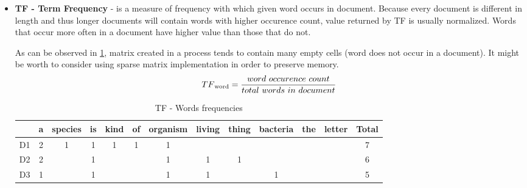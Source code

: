 \begin{itemize}
	\item \textbf{TF - Term Frequency} - is a measure of frequency with which given word occurs in document. Because every document is different in length and thus longer documents will contain words with higher occurence count, value returned by TF is usually normalized. Words that occur more often in a document have higher value than those that do not.
	
	As can be observed in \ref{tf_idf_tf_freq}, matrix created in a process tends to contain many empty cells (word does not occur in a document). It might be worth to consider using sparse matrix implementation in order to preserve memory.
	\[TF\textsubscript{word}=\frac{word\ occurence\ count}{total\ words\ in\ document}\]	
\begin{table}[ht]
	\centering
	\caption{TF - Words frequencies}
	\label{tf_idf_tf_freq}
	\begin{tabular}{@{}lccccccccccc|c|@{}}
		\toprule
		& \multicolumn{1}{l}{a} & \multicolumn{1}{l}{species} & \multicolumn{1}{l}{is} & \multicolumn{1}{l}{kind} & \multicolumn{1}{l}{of} & \multicolumn{1}{l}{organism} & \multicolumn{1}{l}{living} & \multicolumn{1}{l}{thing} & \multicolumn{1}{l}{bacteria} & \multicolumn{1}{l}{the} & \multicolumn{1}{l|}{letter} & \multicolumn{1}{l|}{Total} \\ \midrule
		D1 & 2                     & 1                           & 1                      & 1                        & 1                      & 1                            &                            &                           &                              &                         &                             & 7                          \\ \cmidrule(l){13-13} 
		D2 & 2                     &                             & 1                      &                          &                        & 1                            & 1                          & 1                         &                              &                         &                             & 6                          \\ \cmidrule(l){13-13} 
		D3 & 1                     &                             & 1                      &                          &                        & 1                            & 1                          &                           & 1                            &                         &                             & 5                          \\ \cmidrule(l){13-13} 

\end{tabular}
\end{table}
\end{itemize}

